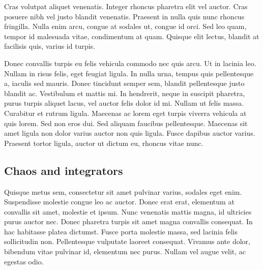 Cras volutpat aliquet venenatis. Integer rhoncus pharetra elit vel auctor. Cras posuere nibh vel justo blandit venenatis. Praesent in nulla quis nunc rhoncus fringilla. Nulla enim arcu, congue at sodales ut, congue id orci. Sed leo quam, tempor id malesuada vitae, condimentum at quam. Quisque elit lectus, blandit at facilisis quis, varius id turpis.

Donec convallis turpis eu felis vehicula commodo nec quis arcu. Ut in lacinia leo. Nullam in risus felis, eget feugiat ligula. In nulla urna, tempus quis pellentesque a, iaculis sed mauris. Donec tincidunt semper sem, blandit pellentesque justo blandit ac. Vestibulum et mattis mi. In hendrerit, neque in suscipit pharetra, purus turpis aliquet lacus, vel auctor felis dolor id mi. Nullam ut felis massa. Curabitur et rutrum ligula. Maecenas ac lorem eget turpis viverra vehicula at quis lorem. Sed non eros dui. Sed aliquam faucibus pellentesque. Maecenas sit amet ligula non dolor varius auctor non quis ligula. Fusce dapibus auctor varius. Praesent tortor ligula, auctor ut dictum eu, rhoncus vitae nunc.

\subsection{Chaos and integrators}

Quisque metus sem, consectetur sit amet pulvinar varius, sodales eget enim. Suspendisse molestie congue leo ac auctor. Donec erat erat, elementum at convallis sit amet, molestie et ipsum. Nunc venenatis mattis magna, id ultricies purus auctor nec. Donec pharetra turpis sit amet magna convallis consequat. In hac habitasse platea dictumst. Fusce porta molestie massa, sed lacinia felis sollicitudin non. Pellentesque vulputate laoreet consequat. Vivamus ante dolor, bibendum vitae pulvinar id, elementum nec purus. Nullam vel augue velit, ac egestas odio.


